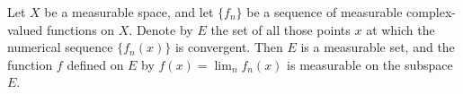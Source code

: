 Let $X$ be a measurable space, and let $\{f_n\}$ be a sequence of measurable complex-valued functions on $X$. Denote by $E$ the set of all those points $x$ at which the numerical sequence $\{f_n(x)\}$ is convergent. Then $E$ is a measurable set, and the function $f$ defined on $E$ by $f(x) = \lim_n f_n(x)$ is measurable on the subspace $E$.
